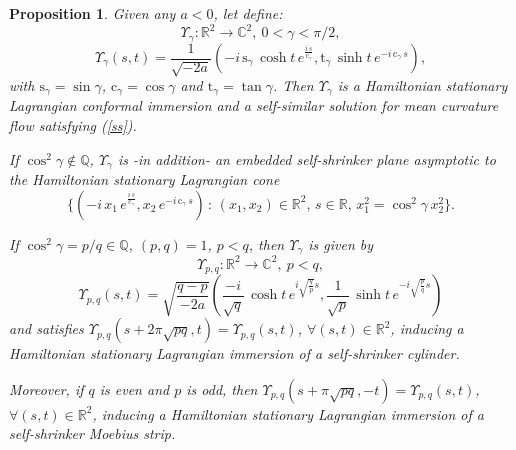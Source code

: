 \documentclass[leqno,11pt]{amsart}
\newtheorem{proposition}{Proposition}
\begin{document}
\begin{proposition}
 Given any $a < 0$, let define:
$$\Upsilon_\gamma:{\mathbb{R}}^2 \rightarrow {\mathbb{C}}^2, \  0<\gamma <\pi/2,$$
\begin{equation}\label{Phib2}
\Upsilon_\gamma(s,t)= \frac{1}{\sqrt{-2a}} \left( -i \,
\mathrm{s}_\gamma \,\cosh t\,e^{\frac{i\,s}{\mathrm{c}_\gamma}} ,
\mathrm{t}_\gamma \, \sinh t\,e^{-i\, \mathrm{c}_\gamma\,s}
\right),
\end{equation}
with $\mathrm{s}_\gamma=\sin \gamma $, $\mathrm{c}_\gamma=\cos
\gamma$ and $\mathrm{t}_\gamma=\tan \gamma$. Then
$\Upsilon_\gamma$ is a Hamiltonian stationary Lagrangian conformal
immersion and a self-similar solution for mean curvature flow
satisfying (\ref{ss}).

If $\cos^2 \gamma \notin {\mathbb{Q}}$, $\Upsilon_\gamma$ is -in addition-
an embedded self-shrinker plane asymptotic to the Hamiltonian
stationary Lagrangian cone
$$\{ (-i\, x_1\, e^{\frac{i\,s}{\mathrm{c}_\gamma}}, x_2\, e^{-i\, \mathrm{c}_\gamma\,s})
\, : \, (x_1,x_2)\in {\mathbb{R}}^2, \, s\in {\mathbb{R}}, \,  x_1^2=\cos^2 \gamma \,
x_2^2\}.$$

If $\cos^2 \gamma = p/q \in {\mathbb{Q}}$, $(p,q)=1$, $p<q$, then
$\Upsilon_\gamma$ is given by 
$$\Upsilon_{p,q}: {\mathbb{R}}^2 \rightarrow {\mathbb{C}}^2, \
p<q,$$
\begin{equation}\label{Phipq2}
\Upsilon_{p,q}(s,t)=\sqrt{\frac{q-p}{-2a}} \left(
\frac{-i}{\sqrt{q}}\,\cosh t\,e^{i \sqrt{\frac{q}{p}}s} ,
\frac{1}{\sqrt{p}}\,\sinh t\,e^{-i \sqrt{\frac{p}{q}}s} \right)
\end{equation}
and satisfies
$\Upsilon_{p,q}(s+2\pi\sqrt{pq},t)=\Upsilon_{p,q}(s,t)$, $\forall
(s,t)\in {\mathbb{R}}^2$, inducing a Hamiltonian stationary Lagrangian
immersion of a self-shrinker cylinder.

Moreover, if $q$ is even and $p$ is odd, then
$\Upsilon_{p,q}(s+\pi\sqrt{pq},-t)=\Upsilon_{p,q}(s,t)$, $\forall
(s,t)\in {\mathbb{R}}^2$, inducing a Hamiltonian stationary Lagrangian
immersion of a self-shrinker Moebius strip.
\end{proposition}
\end{document}
